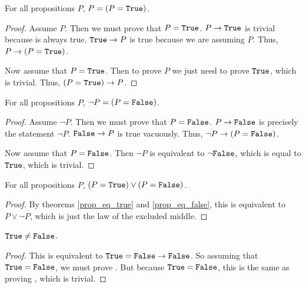 \documentclass[../../math.tex]{subfiles}
\begin{document}
\begin{theorem} \label{prop_eq_true}
    For all propositions $P$, $P = (P = \vtt{True})$.
\end{theorem}
\begin{proof}
    Assume $P$.  Then we must prove that $P = \vtt{True}$.  $P \rightarrow
    \vtt{True}$ is trivial because  is always true.  $\vtt{True}
    \rightarrow P$ is true because we are assuming $P$.  Thus, $P \rightarrow (P
    = \vtt{True})$.

    Now assume that $P = \vtt{True}$.  Then to prove $P$ we just need to prove
    $\vtt{True}$, which is trivial.  Thus, $(P = \vtt{True}) \rightarrow P$.
\end{proof}

\begin{theorem} \label{prop_eq_false}
    For all propositions $P$, $\neg P = (P = \vtt{False})$.
\end{theorem}
\begin{proof}
    Assume $\neg P$.  Then we must prove that $P = \vtt{False}$.  $P \rightarrow
    \vtt{False}$ is precisely the statement $\neg P$.  $\vtt{False} \rightarrow
    P$ is true vacuously.  Thus, $\neg P \rightarrow (P = \vtt{False})$.

    Now assume that $P = \vtt{False}$.  Then $\neg P$ is equivalent to $\neg
    \vtt{False}$, which is equal to $\vtt{True}$, which is trivial.
\end{proof}

\begin{theorem} \label{prop_split}
    For all propositions $P$, $(P = \vtt{True}) \vee (P = \vtt{False})$.
\end{theorem}
\begin{proof}
    By theorems \ref{prop_eq_true} and \ref{prop_eq_false}, this is equivalent
    to $P \vee \neg P$, which is just the law of the excluded middle.
\end{proof}

\begin{theorem} \label{prop_neq}
    $\vtt{True} \neq \vtt{False}$.
\end{theorem}
\begin{proof}
    This is equivalent to $\vtt{True} = \vtt{False} \rightarrow \vtt{False}$.
    So assuming that $\vtt{True} = \vtt{False}$, we must prove .  But
    because $\vtt{True} = \vtt{False}$, this is the same as proving ,
    which is trivial.
\end{proof}
\end{document}
